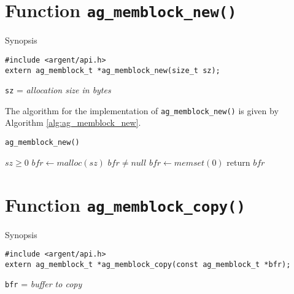 %

\section{Function \texttt{ag\_memblock\_new()}}


\begin{bclogo}[logo=\bccrayon, noborder=true, barre=snake, couleurBarre=gray]
  {Synopsis}
\lstset{style=SYNOPSIS}

\begin{lstlisting}[linewidth=1.0\linewidth]
#include <argent/api.h>
extern ag_memblock_t *ag_memblock_new(size_t sz);
\end{lstlisting}

\scriptsize
\texttt{sz} = \emph{allocation size in bytes}
\end{bclogo}

The algorithm for the implementation of \verb|ag_memblock_new()| is given by
Algorithm \ref{alg:ag_memblock_new}.

\begin{algorithm}
\scriptsize
\caption{\texttt{ag\_memblock\_new()}}
\label{alg:ag_memblock_new}

\begin{algorithmic}
\Require $sz \geq 0$
\State $bfr \gets malloc(sz)$
\Ensure $bfr \neq null$
\State $bfr \gets memset(0)$
\State return $bfr$
\EndProcedure
\end{algorithmic}

\end{algorithm}

%


\section{Function \texttt{ag\_memblock\_copy()}}
  \begin{bclogo}[logo=\bccrayon, noborder=true, barre=snake, couleurBarre=gray]
    {Synopsis}
  \lstset{style=SYNOPSIS}
  \begin{lstlisting}[linewidth=1.0\linewidth]
#include <argent/api.h>
extern ag_memblock_t *ag_memblock_copy(const ag_memblock_t *bfr);
  \end{lstlisting}
  \scriptsize
  \texttt{bfr} = \emph{buffer to copy}
  \end{bclogo}

